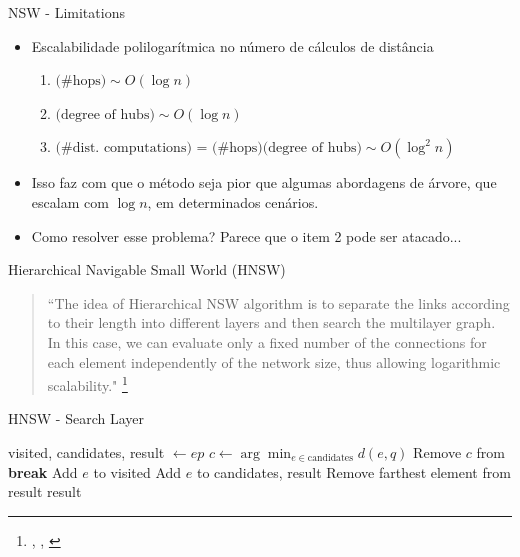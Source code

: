 \documentclass[11pt]{beamer}
\makeatletter
\renewcommand{\footfullcite}[1]{%
  \footnote{\scriptsize \citeauthor{#1}, {\color{beamer@blendedblue} \citetitle{#1}}, \citeyear{#1}}%
}
\makeatother
\begin{document}
\begin{frame}{NSW - Limitations}
    \begin{itemize}
        \item Escalabilidade polilogarítmica no número de cálculos de distância
        \begin{enumerate}
            \item $\text{(\# hops)}\sim O(\log n)$
                \item $\text{(degree of hubs)}\sim O(\log n)$
            \item $\text{(\# dist. computations) = (\# hops)(degree of hubs)} \sim O(\log^2 n)$
        \end{enumerate}
        \item Isso faz com que o método seja pior que algumas abordagens de árvore, que escalam com $\log n$, em determinados cenários.
        \item Como resolver esse problema? Parece que o item 2 pode ser atacado...
    \end{itemize}
\end{frame}

\begin{frame}{Hierarchical Navigable Small World (HNSW)}

\begin{quote}
    \small
    ``The idea of Hierarchical NSW algorithm is to separate the links according to their length into different layers and then search the multilayer graph. {\color{beamer@blendedblue}In this case, we can evaluate only a fixed number of the connections for each element independently of the network size, thus allowing logarithmic scalability}."\footfullcite{hnsw:malkov2018}
\end{quote}

\end{frame}

\begin{frame}{HNSW - Search Layer}

\begin{algorithm}[H]
\caption{HNSW Search Layer}\label{alg:HNSW-SL}
\begin{algorithmic}[1]
\State visited, candidates, result $\gets ep$
    \State $c \gets \arg\min_{e \in \text{candidates}} d(e, q)$
    \State Remove $c$ from 
        \State \textbf{break}
    \EndIf
            \State Add $e$ to visited
                \State Add $e$ to candidates, result
                    \State Remove farthest element from result
                \EndIf
            \EndIf
        \EndIf
    \EndFor
\EndWhile
\Return result
\EndProcedure
\end{algorithmic}
\end{algorithm}
    
\end{frame}
\end{document}
